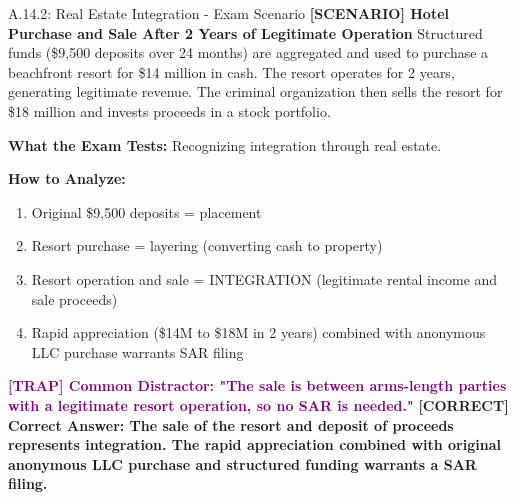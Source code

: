 \documentclass[11pt,a4paper]{beamer}
\newcommand{\trap}[1]{\textcolor{purple}{\textbf{[TRAP] #1}}}
\newcommand{\correct}[1]{\textcolor{green!50!black}{\textbf{[CORRECT] #1}}}
\newcommand{\scenario}[1]{\textcolor{blue!70!black}{\textbf{[SCENARIO] #1}}}
\begin{document}
	\begin{frame}{A.14.2: Real Estate Integration - Exam Scenario}
		\scenario{Hotel Purchase and Sale After 2 Years of Legitimate Operation}
		Structured funds (\$9,500 deposits over 24 months) are aggregated and used to purchase a beachfront resort for \$14 million in cash. The resort operates for 2 years, generating legitimate revenue. The criminal organization then sells the resort for \$18 million and invests proceeds in a stock portfolio.
		
		\vspace{0.1cm}
		\textbf{What the Exam Tests:} Recognizing integration through real estate.
		
		\vspace{0.1cm}
		\textbf{How to Analyze:}
		\begin{enumerate}
			\item Original \$9,500 deposits = placement
			\item Resort purchase = layering (converting cash to property)
			\item Resort operation and sale = INTEGRATION (legitimate rental income and sale proceeds)
			\item Rapid appreciation (\$14M to \$18M in 2 years) combined with anonymous LLC purchase warrants SAR filing
		\end{enumerate}
		
		\trap{Common Distractor: "The sale is between arms-length parties with a legitimate resort operation, so no SAR is needed."}
		\correct{Correct Answer: The sale of the resort and deposit of proceeds represents integration. The rapid appreciation combined with original anonymous LLC purchase and structured funding warrants a SAR filing.}
	\end{frame}
	
	
\end{document}
